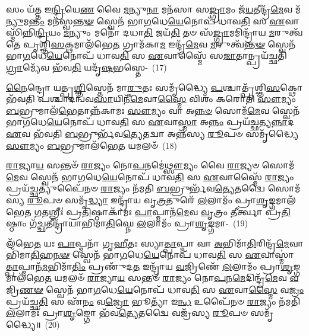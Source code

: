 𑌸𑌂 𑌯᳴𑌤𑍍𑌤 𑌇\-\ul{𑌨𑍍𑌦𑍍𑌰𑌿}\-𑌯𑍇\-\ul{𑌣} 𑌵𑍈 \ul{𑌮}\-𑌨𑍍𑌯𑍁\-\ul{𑌨𑌾} 𑌮𑌨᳴𑌸𑌾 𑌸\-\ul{𑌙𑍍𑌗𑍍𑌰𑌾}\-𑌮𑌂 𑌜᳴\-\ul{𑌯}\-𑌤𑍀𑌨𑍍𑌦𑍍𑌰᳴\-\ul{𑌮𑍇}\-𑌵 𑌮᳴\-\ul{𑌨𑍍𑌯𑍁}\-𑌮\-\ul{𑌨𑍍𑌤𑌂} 𑌮𑌨᳴𑌸𑍍𑌵\-\ul{𑌨𑍍𑌤}\-\-\ul{𑍟} 𑌸𑍍𑌵𑍇𑌨᳴ 𑌭𑌾\-\ul{𑌗}\-𑌧𑍇\-\ul{𑌯𑍇}\-𑌨𑍋𑌪᳴ 𑌧𑌾𑌵\-\ul{𑌤𑌿} 𑌸 \ul{𑌏}\-𑌵𑌾𑌸𑍍𑌮𑌿᳴𑌨𑍍𑌨𑌿\-\ul{𑌨𑍍𑌦𑍍𑌰𑌿}\-𑌯𑌂 \ul{𑌮}\-𑌨𑍍𑌯𑍁𑌂 𑌮𑌨𑍋᳴ 𑌦𑌧𑌾\-\ul{𑌤𑌿} 𑌜𑌯᳴\-\ul{𑌤𑌿} 𑌤𑍞 𑌸᳴\-\ul{𑌙𑍍𑌗𑍍𑌰𑌾}\-𑌮𑌮𑌿𑌨𑍍𑌦𑍍𑌰𑌾᳴𑌯 \ul{𑌮}\-𑌰𑍁𑌤𑍍𑌵᳴𑌤𑍇 𑌪𑍃𑌶𑍍𑌞𑌿\-\ul{𑌸}\-𑌕𑍍𑌥𑌮𑌾\-𑌲᳴𑌭𑍇\-\ul{𑌤} 𑌗𑍍𑌰𑌾𑌮᳴𑌕𑌾\-\ul{𑌮} 𑌇𑌨𑍍𑌦𑍍𑌰᳴\-\ul{𑌮𑍇}\-𑌵 \ul{𑌮}\-𑌰𑍁𑌤𑍍𑌵᳴\-\ul{𑌨𑍍𑌤}\-\-\ul{𑍟} 𑌸𑍍𑌵𑍇𑌨᳴ 𑌭𑌾\-\ul{𑌗}\-𑌧𑍇\-\ul{𑌯𑍇}\-𑌨𑍋𑌪᳴ 𑌧𑌾𑌵\-\ul{𑌤𑌿} 𑌸 \ul{𑌏}\-𑌵𑌾𑌸𑍍𑌮𑍈᳴ 𑌸\-\ul{𑌜𑌾}\-𑌤𑌾𑌨𑍍𑌪𑍍𑌰𑌯᳴𑌚𑍍𑌛𑌤𑌿 \ul{𑌗𑍍𑌰𑌾}\-𑌮𑍍𑌯𑍇᳴𑌵 𑌭᳴𑌵\-\ul{𑌤𑌿} 𑌯𑌦𑍃᳴\-\ul{𑌷}\-𑌭𑌸𑍍𑌤𑍇-~(17)

\-\ul{𑌨𑍈}\-𑌨𑍍𑌦𑍍𑌰𑍋 𑌯𑌤𑍍𑌪𑍃\-\ul{𑌶𑍍𑌞𑌿}\-𑌸𑍍𑌤𑍇𑌨᳴ 𑌮𑌾\-\ul{𑌰𑍁}\-𑌤𑌃 𑌸𑌮𑍃᳴𑌦𑍍𑌧𑍍𑌯𑍈 \ul{𑌪}\-𑌶𑍍𑌚𑌾𑌤𑍍𑌪𑍃᳴𑌶𑍍𑌞𑌿\-\ul{𑌸}\-𑌕𑍍𑌥𑍋 𑌭᳴𑌵𑌤𑌿 𑌪𑌶𑍍𑌚𑌾𑌦𑌨𑍍𑌵𑌵\-\ul{𑌸𑌾}\-𑌯𑌿𑌨𑍀᳴\-\ul{𑌮𑍇}\-𑌵𑌾\-\ul{𑌸𑍍𑌮𑍈} 𑌵𑌿𑌶𑌂᳴ 𑌕𑌰𑍋𑌤𑌿 \ul{𑌸𑍗}\-𑌮𑍍𑌯𑌂 \ul{𑌬}\-𑌭𑍍𑌰𑍁𑌮𑌾𑌲᳴\-\ul{𑌭𑍇}\-𑌤𑌾𑌨𑍍𑌨᳴𑌕𑌾𑌮𑌃 \ul{𑌸𑍗}\-𑌮𑍍𑌯𑌂 𑌵𑌾 𑌅\-\ul{𑌨𑍍𑌨}\-\-\ul{𑍞} 𑌸𑍋𑌮᳴\-\ul{𑌮𑍇}\-𑌵 𑌸𑍍𑌵𑍇𑌨᳴ 𑌭𑌾\-\ul{𑌗}\-𑌧𑍇\-\ul{𑌯𑍇}\-𑌨𑍋𑌪᳴ 𑌧𑌾𑌵\-\ul{𑌤𑌿} 𑌸 \ul{𑌏}\-𑌵𑌾\-\ul{𑌸𑍍𑌮𑌾} 𑌅\-\ul{𑌨𑍍𑌨𑌂} 𑌪𑍍𑌰𑌯᳴𑌚𑍍𑌛𑌤𑍍𑌯\-\ul{𑌨𑍍𑌨𑌾}\-𑌦 \ul{𑌏}\-𑌵 𑌭᳴𑌵𑌤𑌿 \ul{𑌬}\-𑌭𑍍𑌰𑍁𑌰𑍍𑌭᳴𑌵\-\ul{𑌤𑍍𑌯𑍇}\-𑌤𑌦𑍍𑌵𑌾 𑌅𑌨𑍍𑌨᳴𑌸𑍍𑌯 \ul{𑌰𑍂}\-𑌪𑍞 𑌸𑌮𑍃᳴𑌦𑍍𑌧𑍍𑌯𑍈 \ul{𑌸𑍗}\-𑌮𑍍𑌯𑌂 \ul{𑌬}\-𑌭𑍍𑌰𑍁𑌮𑌾\-𑌲᳴𑌭𑍇\-\ul{𑌤} 𑌯𑌮𑌲𑍞᳴~(18)

\-\ul{𑌰𑌾}\-𑌜𑍍𑌯𑌾\-\ul{𑌯} 𑌸𑌨𑍍𑌤𑍞᳴ \ul{𑌰𑌾}\-𑌜𑍍𑌯𑌂 𑌨𑍋\-\ul{𑌪}\-𑌨𑌮𑍇॑\-\ul{𑌥𑍍𑌸𑍗}\-𑌮𑍍𑌯𑌂 𑌵𑍈 \ul{𑌰𑌾}\-𑌜𑍍𑌯𑍞 𑌸𑍋𑌮᳴\-\ul{𑌮𑍇}\-𑌵 𑌸𑍍𑌵𑍇𑌨᳴ 𑌭𑌾\-\ul{𑌗}\-𑌧𑍇\-\ul{𑌯𑍇}\-𑌨𑍋𑌪᳴ 𑌧𑌾𑌵\-\ul{𑌤𑌿} 𑌸 \ul{𑌏}\-𑌵𑌾𑌸𑍍𑌮𑍈᳴ \ul{𑌰𑌾}\-𑌜𑍍𑌯𑌂 𑌪𑍍𑌰𑌯᳴\-\ul{𑌚𑍍𑌛}\-𑌤𑍍𑌯𑍁𑌪𑍈᳴𑌨𑍞 \ul{𑌰𑌾}\-𑌜𑍍𑌯𑌂 𑌨᳴𑌮𑌤𑌿 \ul{𑌬}\-𑌭𑍍𑌰𑍁𑌰𑍍𑌭᳴𑌵\-\ul{𑌤𑍍𑌯𑍇}\-𑌤𑌦𑍍𑌵𑍈 𑌸𑍋𑌮᳴𑌸𑍍𑌯 \ul{𑌰𑍂}\-𑌪𑍞 𑌸𑌮𑍃᳴\-\ul{𑌦𑍍𑌧𑍍𑌯𑌾} 𑌇𑌨𑍍𑌦𑍍𑌰𑌾᳴𑌯 𑌵𑍃\-\ul{𑌤𑍍𑌰}\-𑌤𑍁𑌰𑍇᳴ \ul{𑌲}\-𑌲𑌾𑌮𑌂᳴ 𑌪𑍍𑌰𑌾\-\ul{𑌶𑍃}\-𑌙𑍍𑌗𑌮𑌾𑌲᳴𑌭𑍇𑌤 \ul{𑌗}\-𑌤𑌶𑍍𑌰𑍀𑌃॑ 𑌪𑍍𑌰\-\ul{𑌤𑌿}\-𑌷𑍍𑌠𑌾𑌕𑌾᳴𑌮𑌃 \ul{𑌪𑌾}\-𑌪𑍍𑌮𑌾𑌨᳴\-\ul{𑌮𑍇}\-𑌵 \ul{𑌵𑍃}\-𑌤𑍍𑌰𑌂 \ul{𑌤𑍀}\-𑌰𑍍𑌤𑍍𑌵𑌾 𑌪𑍍𑌰᳴\-\ul{𑌤𑌿}\-𑌷𑍍𑌠𑌾𑌂 𑌗᳴\-\ul{𑌚𑍍𑌛}\-𑌤𑍀𑌨𑍍𑌦𑍍𑌰𑌾᳴𑌯𑌾𑌭𑌿𑌮𑌾\-\ul{𑌤𑌿}\-𑌘𑍍𑌨𑍇 \ul{𑌲}\-𑌲𑌾𑌮𑌂᳴ 𑌪𑍍𑌰𑌾\-\ul{𑌶𑍃}\-𑌙𑍍𑌗𑌮𑌾-~(19)

\-𑌲᳴𑌭𑍇\-\ul{𑌤} 𑌯𑌃 \ul{𑌪𑌾}\-𑌪𑍍𑌮𑌨𑌾᳴ 𑌗𑍃\-\ul{𑌹𑍀}\-𑌤𑌃 𑌸𑍍𑌯𑌾\-\ul{𑌤𑍍𑌪𑌾}\-𑌪𑍍𑌮𑌾 𑌵𑌾 \ul{𑌅}\-𑌭𑌿𑌮𑌾᳴\-\ul{𑌤𑌿}\-𑌰𑌿𑌨𑍍𑌦𑍍𑌰᳴\-\ul{𑌮𑍇}\-𑌵𑌾𑌭𑌿᳴𑌮𑌾\-\ul{𑌤𑌿}\-𑌹\-\ul{𑌨}\-\-\ul{𑍟} 𑌸𑍍𑌵𑍇𑌨᳴ 𑌭𑌾\-\ul{𑌗}\-𑌧𑍇\-\ul{𑌯𑍇}\-𑌨𑍋𑌪᳴ 𑌧𑌾𑌵\-\ul{𑌤𑌿} 𑌸 \ul{𑌏}\-𑌵𑌾𑌸𑍍𑌮𑌾॑\-\ul{𑌤𑍍𑌪𑌾}\-𑌪𑍍𑌮𑌾𑌨᳴\-\ul{𑌮}\-𑌭𑌿𑌮𑌾᳴\-\ul{𑌤𑌿𑌂} 𑌪𑍍𑌰𑌣𑍁᳴𑌦\-\ul{𑌤} 𑌇𑌨𑍍𑌦𑍍𑌰𑌾᳴𑌯 \ul{𑌵}\-𑌜𑍍𑌰𑌿𑌣𑍇᳴ \ul{𑌲}\-𑌲𑌾𑌮𑌂᳴ 𑌪𑍍𑌰𑌾\-\ul{𑌶𑍃}\-𑌙𑍍𑌗𑌮𑌾\-𑌲᳴𑌭𑍇\-\ul{𑌤} 𑌯𑌮𑌲𑍞᳴ \ul{𑌰𑌾}\-𑌜𑍍𑌯𑌾\-\ul{𑌯} 𑌸𑌨𑍍𑌤𑍞᳴ \ul{𑌰𑌾}\-𑌜𑍍𑌯𑌂 𑌨𑍋\-\ul{𑌪}\-𑌨\-\ul{𑌮𑍇}\-𑌦𑌿𑌨𑍍𑌦𑍍𑌰᳴\-\ul{𑌮𑍇}\-𑌵 \ul{𑌵}\-𑌜𑍍𑌰𑌿\-\ul{𑌣}\-\-\ul{𑍟} 𑌸𑍍𑌵𑍇𑌨᳴ 𑌭𑌾\-\ul{𑌗}\-𑌧𑍇\-\ul{𑌯𑍇}\-𑌨𑍋𑌪᳴ 𑌧𑌾𑌵\-\ul{𑌤𑌿} 𑌸 \ul{𑌏}\-𑌵𑌾\-\ul{𑌸𑍍𑌮𑍈} 𑌵\-\ul{𑌜𑍍𑌰𑌂} 𑌪𑍍𑌰𑌯᳴𑌚𑍍𑌛\-\ul{𑌤𑌿} 𑌸 𑌏᳴\-\ul{𑌨𑌂} 𑌵\-\ul{𑌜𑍍𑌰𑍋} 𑌭𑍂𑌤𑍍𑌯𑌾᳴ 𑌇\-\ul{𑌨𑍍𑌧} 𑌉𑌪𑍈᳴𑌨𑍞 \ul{𑌰𑌾}\-𑌜𑍍𑌯𑌂 𑌨᳴𑌮𑌤𑌿 \ul{𑌲}\-𑌲𑌾𑌮𑌃᳴ 𑌪𑍍𑌰𑌾\-\ul{𑌶𑍃}\-𑌙𑍍𑌗𑍋 𑌭᳴𑌵\-\ul{𑌤𑍍𑌯𑍇}\-𑌤𑌦𑍍𑌵𑍈 𑌵𑌜𑍍𑌰᳴𑌸𑍍𑌯 \ul{𑌰𑍂}\-𑌪𑍞 𑌸𑌮𑍃᳴𑌦𑍍𑌧𑍍𑌯𑍈॥~(20)

